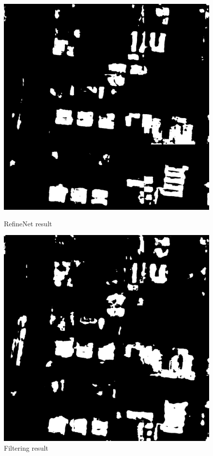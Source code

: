 \documentclass[]{IEEEtran}
\begin{document}


\newpage


\begin{figure}
	\vspace{2.5cm}
	\begin{minipage}[t]{0.5\linewidth}
		\centering
		\includegraphics[width=0.9\columnwidth]{fw}
		\caption{RefineNet result}
		\label{fig:fw}
	\end{minipage}%
	\begin{minipage}[t]{0.5\linewidth}
		\centering
		\includegraphics[width=0.9\columnwidth]{filter}
		\caption{Filtering result}
		\label{fig:rt}
	\end{minipage}
\end{figure}
\end{document}
